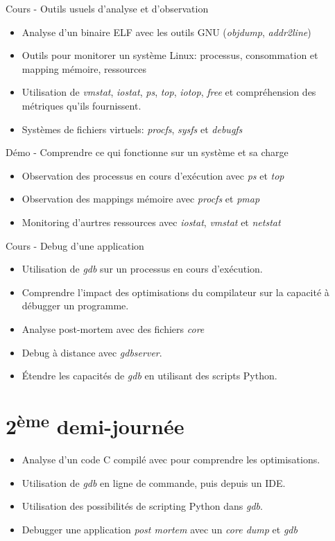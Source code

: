 \documentclass[a4paper,12pt,obeyspaces,spaces,hyphens]{article}
\begin{document}
\feagendatwocolumn
{Cours - Outils usuels d'analyse et d'observation}
{
  \begin{itemize}
  \item Analyse d'un binaire ELF avec les outils GNU ({\em objdump},
    {\em addr2line})
  \item Outils pour monitorer un système Linux: processus,
    consommation et mapping mémoire, ressources
  \item Utilisation de {\em vmstat}, {\em iostat}, {\em ps}, {\em
      top}, {\em iotop}, {\em free} et compréhension des métriques
    qu'ils fournissent.
  \item Systèmes de fichiers virtuels: {\em procfs}, {\em sysfs} et
    {\em debugfs}
  \end{itemize}
}
{Démo - Comprendre ce qui fonctionne sur un système et sa charge}
{
  \begin{itemize}
  \item Observation des processus en cours d'exécution avec {\em ps} et {\em top}
  \item Observation des mappings mémoire avec {\em procfs} et {\em pmap}
  \item Monitoring d'aurtres ressources avec {\em iostat}, {\em
      vmstat} et {\em netstat}
 \end{itemize}
}

\feagendaonecolumn
{Cours - Debug d'une application}
{
  \begin{itemize}
  \item Utilisation de {\em gdb} sur un processus en cours d'exécution.
  \item Comprendre l'impact des optimisations du compilateur sur la
    capacité à débugger un programme.
  \item Analyse post-mortem avec des fichiers {\em core}
  \item Debug à distance avec {\em gdbserver}.
  \item Étendre les capacités de {\em gdb} en utilisant des scripts
    Python.
  \end{itemize}
}

\section{2\textsuperscript{ème} demi-journée}

{
  \begin{itemize}
  \item Analyse d'un code C compilé avec  pour
    comprendre les optimisations.
  \item Utilisation de {\em gdb} en ligne de commande, puis depuis un
    IDE.
  \item Utilisation des possibilités de scripting Python dans {\em gdb}.
  \item Debugger une application {\em post mortem} avec un {\em core
      dump} et {\em gdb}
  \end{itemize}
}
\end{document}
